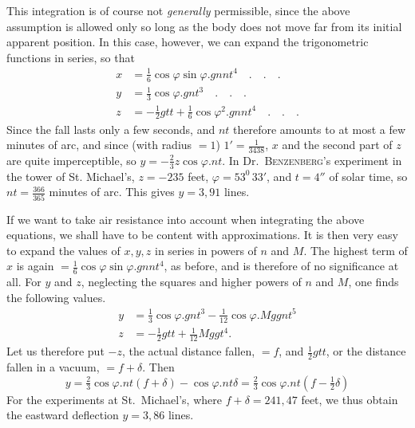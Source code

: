 This integration is of course not \textit{generally} permissible, since the above assumption is allowed only so long as the body does not move far from its initial apparent position. In this case, however, we can expand the trigonometric functions in series, so that
\[
\begin{aligned}
x&=\tfrac16\cos\varphi\sin\varphi.gnnt^4\quad.\quad.\quad.\\
y&=\tfrac13\cos\varphi.gnt^3\quad.\quad.\quad.\\
z&=-\tfrac12gtt+\tfrac16\cos\varphi^2.gnnt^4\quad.\quad.\quad.
\end{aligned}
\]
Since the fall lasts only a few seconds, and $nt$ therefore amounts to at most a few minutes of arc, and since (with radius $=1$) $1'=\tfrac{1}{3438}$, $x$ and the second part of $z$ are quite imperceptible, so $y=-\tfrac23z\cos\varphi.nt$. In Dr.\ \textsc{Benzenberg}'s experiment in the tower of St. Michael's, $z=-235$ feet, $\varphi=53^0\,33'$, and $t=4''$ of solar time, so $nt=\tfrac{366}{365}$ minutes of arc. This gives $y=3{,}91$ lines.

If we want to take air resistance into account when integrating the above equations, we shall have to be content with approximations. It is then very easy to expand the values of $x,y,z$ in series in powers of $n$ and $M$. The highest term of $x$ is again $=\tfrac16\cos\varphi\sin\varphi.gnnt^4$, as before, and is therefore of no significance at all. For $y$ and $z$, neglecting the squares and higher powers of $n$ and $M$, one finds the following values.
\[
\begin{aligned}
y&=\tfrac13\cos\varphi.gnt^3-\tfrac{1}{12}\cos\varphi.Mggnt^5\\
z&=-\tfrac12gtt+\tfrac{1}{12}Mggt^4.
\end{aligned}
\]
Let us therefore put $-z$, the actual distance fallen, $=f$, and $\tfrac12gtt$, or the distance fallen in a vacuum, $=f+\delta$. Then
\[
y=\tfrac23\cos\varphi.nt(f+\delta)-\cos\varphi.nt\delta=\tfrac23\cos\varphi.nt(f-\tfrac12\delta)
\]
For the experiments at St.\ Michael's, where $f+\delta=241{,}47$ feet, we thus obtain the eastward deflection $y=3{,}86$ lines.


